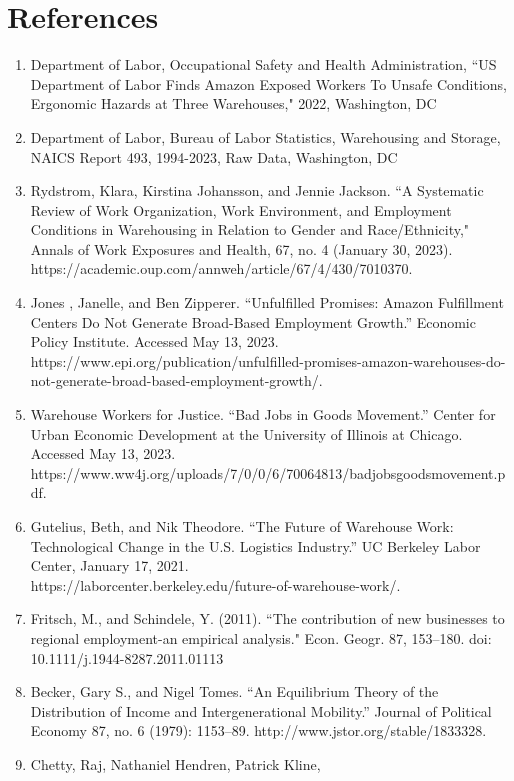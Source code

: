 \documentclass[11pt]{article}
\begin{document}
\section{References}
\begin{center}
\begin{enumerate}
 \item Department of Labor, Occupational Safety and Health Administration, “US Department of Labor Finds Amazon Exposed Workers To Unsafe Conditions, Ergonomic Hazards at Three Warehouses," 2022, Washington, DC
 \item Department of Labor, Bureau of Labor Statistics, Warehousing and Storage,  NAICS Report 493, 1994-2023, Raw Data, Washington, DC
 \item Rydstrom, Klara, Kirstina Johansson, and Jennie Jackson. “A Systematic Review of Work Organization, Work Environment, and Employment Conditions in Warehousing in Relation to Gender and Race/Ethnicity," Annals of Work Exposures and Health, 67, no. 4 (January 30, 2023). https://academic.oup.com/annweh/article/67/4/430/7010370. 
 \item Jones , Janelle, and Ben Zipperer. “Unfulfilled Promises: Amazon Fulfillment Centers Do Not Generate Broad-Based Employment Growth.” Economic Policy Institute. Accessed May 13, 2023. https://www.epi.org/publication/unfulfilled-promises-amazon-warehouses-do-not-generate-broad-based-employment-growth/. 
 \item Warehouse Workers for Justice. “Bad Jobs in Goods Movement.” Center for Urban Economic Development at the University of Illinois at Chicago. Accessed May 13, 2023. \\ https://www.ww4j.org/uploads/7/0/0/6/70064813/badjobsgoodsmovement.pdf. 
 \item Gutelius, Beth, and Nik Theodore. “The Future of Warehouse Work: Technological Change in the U.S. Logistics Industry.” UC Berkeley Labor Center, January 17, 2021. \\ https://laborcenter.berkeley.edu/future-of-warehouse-work/. 
 \item Fritsch, M., and Schindele, Y. (2011). “The contribution of new businesses to regional employment-an empirical analysis." Econ. Geogr. 87, 153–180. doi: 10.1111/j.1944-8287.2011.01113
 \item Becker, Gary S., and Nigel Tomes. “An Equilibrium Theory of
the Distribution of Income and Intergenerational Mobility.” Journal of Political Economy 87, no. 6 (1979): 1153–89. http://www.jstor.org/stable/1833328.
 \item Chetty, Raj, Nathaniel Hendren, Patrick Kline,

\end{enumerate}
\end{center}
\end{document}
